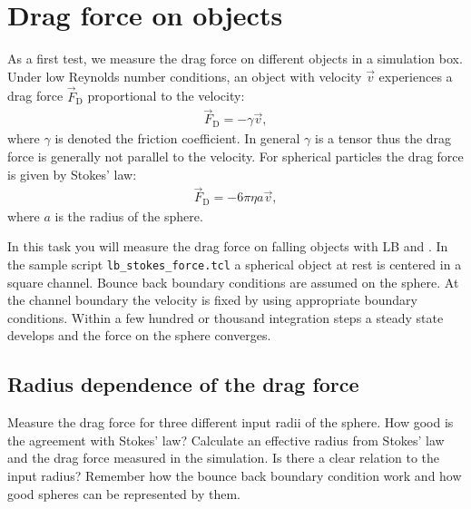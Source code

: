 \section{Drag force on objects}
As a first test, we measure the drag force on different objects in a simulation
box. Under low Reynolds number conditions, an object with velocity $\vec{v}$
experiences a drag force $\vec{F}_\text{D}$ proportional to the velocity:
\begin{align*}
	\vec{F}_\text{D}=-\gamma\vec{v},
\end{align*}
where $\gamma$ is denoted the friction coefficient. In general $\gamma$ is a
tensor thus the drag force is generally not parallel to the velocity. For
spherical particles the drag force is given by Stokes' law:
\begin{align*}
	\vec{F}_\text{D}=-6\pi\eta a\vec{v},
\end{align*}
where $a$ is the radius of the sphere.

In this task you will measure the drag force on falling objects with LB and
\ES{}. In the sample script {\tt lb\_stokes\_force.tcl} a spherical object at rest
is centered in a square channel. Bounce back boundary conditions are assumed on
the sphere. At the channel boundary the velocity is fixed by using appropriate
boundary conditions. Within a few hundred or thousand  integration steps a
steady state develops and the force on the sphere converges.

\subsection*{Radius dependence of the drag force}
Measure the drag force for three different input radii of the sphere. How good
is the agreement with Stokes' law? Calculate an effective radius from Stokes'
law and the drag force measured in the simulation. Is there a clear relation to
the input radius? Remember how the bounce back boundary condition work and how
good spheres can be represented by them.

